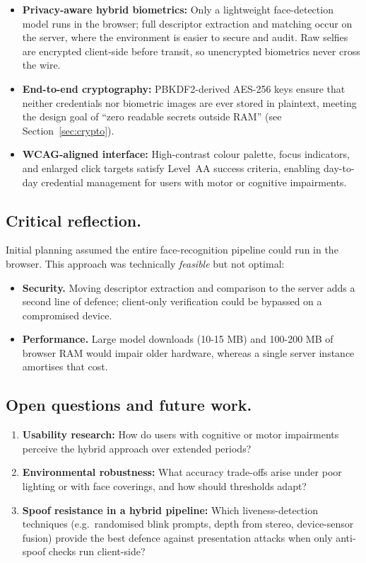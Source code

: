 \begin{itemize}
  \item \textbf{Privacy-aware hybrid biometrics:} Only a lightweight face-detection model runs in the browser; full descriptor extraction and matching occur on the server, where the environment is easier to secure and audit. Raw selfies are encrypted client-side before transit, so unencrypted biometrics never cross the wire.
  \item \textbf{End-to-end cryptography:} PBKDF2-derived AES-256 keys ensure that neither credentials nor biometric images are ever stored in plaintext, meeting the design goal of ``zero readable secrets outside RAM'' (see Section~\ref{sec:crypto}).
  \item \textbf{WCAG-aligned interface:} High-contrast colour palette, focus indicators, and enlarged click targets satisfy Level~AA success criteria, enabling day-to-day credential management for users with motor or cognitive impairments.
\end{itemize}

\subsection{Critical reflection.}
Initial planning assumed the entire face-recognition pipeline could run in the browser. This approach was technically \emph{feasible} but not optimal:  
\begin{itemize}
  \item \textbf{Security.} Moving descriptor extraction and comparison to the server adds a second line of defence; client-only verification could be bypassed on a compromised device.
  \item \textbf{Performance.} Large model downloads (10-15 MB) and 100-200 MB of browser RAM would impair older hardware, whereas a single server instance amortises that cost.
\end{itemize}


\subsection{Open questions and future work.}
\begin{enumerate}
  \item \textbf{Usability research:} How do users with cognitive or motor impairments perceive the hybrid approach over extended periods?
  \item \textbf{Environmental robustness:} What accuracy trade-offs arise under poor lighting or with face coverings, and how should thresholds adapt?
  \item \textbf{Spoof resistance in a hybrid pipeline:} Which liveness-detection techniques (e.g.\ randomised blink prompts, depth from stereo, device-sensor fusion) provide the best defence against presentation attacks when only anti-spoof checks run client-side?
\end{enumerate}


